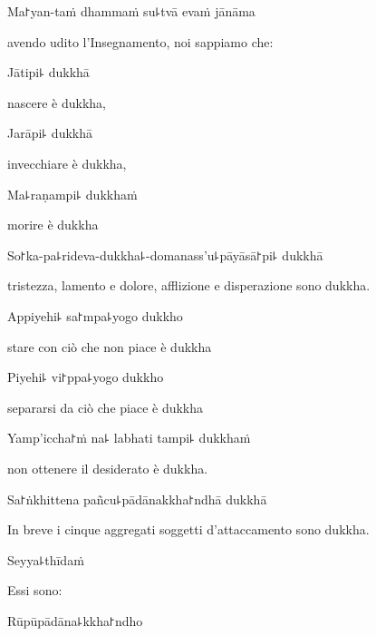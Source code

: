 Ma꜓yan-taṁ dhammaṁ su꜕tvā evaṁ jānāma

\begin{english}
avendo udito l'Insegnamento, noi sappiamo che:
\end{english}

Jātipi꜕ dukkhā

\begin{english}
nascere è dukkha,
\end{english}

Jarāpi꜕ dukkhā

\begin{english}
 invecchiare è dukkha,
\end{english}

Ma꜕raṇampi꜕ dukkhaṁ

\begin{english}
morire è dukkha
\end{english}

So꜓ka-pa꜕rideva-dukkha꜕-domanass'u꜕pāyāsā꜓pi꜕ dukkhā

\begin{english}
tristezza, lamento e dolore, 
afflizione e disperazione sono dukkha.
\end{english}

Appiyehi꜕ sa꜓mpa꜕yogo dukkho

\begin{english}
stare con ciò che non piace è dukkha
\end{english}

Piyehi꜕ vi꜓ppa꜕yogo dukkho

\begin{english}
separarsi da ciò che piace è dukkha
\end{english}

Yamp'iccha꜓ṁ na꜕ labhati tampi꜕ dukkhaṁ

\begin{english}
non ottenere il desiderato è dukkha.
\end{english}

Sa꜓ṅkhittena pañcu꜕pādānakkha꜓ndhā dukkhā

\begin{english}
In breve i cinque aggregati soggetti d'attaccamento sono dukkha.
\end{english}

Seyya꜕thīdaṁ

\begin{english}
Essi sono:
\end{english}

Rūpūpādāna꜕kkha꜓ndho

